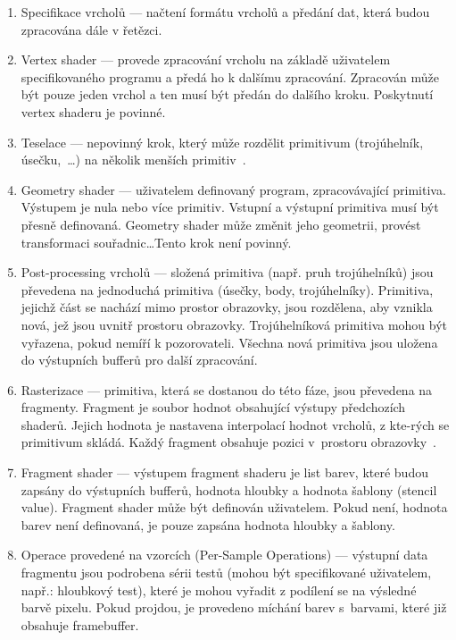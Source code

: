 \documentclass[thesis=M,czech]{FITthesis}[2019/12/23]
\begin{document}
\begin{enumerate}
\item Specifikace vrcholů --- načtení formátu vrcholů a předání dat, která budou zpracována dále v řetězci. 

\item Vertex shader --- provede zpracování vrcholu na základě uživatelem specifikovaného programu a předá ho k dalšímu zpracování. Zpracován může být pouze jeden vrchol a ten musí být předán do dalšího kroku. Poskytnutí vertex shaderu je povinné.

\item Teselace --- nepovinný krok, který může rozdělit primitivum (trojúhelník, úsečku,~\dots) na několik menších primitiv~\cite{kronos_tess}.

\item Geometry shader --- uživatelem definovaný program, zpracovávající primitiva. Výstupem je nula nebo více primitiv. Vstupní a výstupní primitiva musí být přesně definovaná. Geometry shader může změnit jeho geometrii, provést transformaci souřadnic\dots Tento krok není povinný.

\item Post-processing vrcholů --- složená primitiva (např. pruh trojúhelníků) jsou převedena na jednoduchá primitiva (úsečky, body, trojúhelníky). Primitiva, jejichž část se nachází mimo prostor obrazovky, jsou rozdělena, aby vznikla nová, jež jsou uvnitř prostoru obrazovky. Trojúhelníková primitiva mohou být vyřazena, pokud nemíří k pozorovateli. Všechna nová primitiva jsou uložena do výstupních bufferů pro další zpracování.

\item Rasterizace --- primitiva, která se dostanou do této fáze, jsou převedena na fragmenty. Fragment je soubor hodnot obsahující výstupy předchozích shaderů. Jejich hodnota je nastavena interpolací hodnot vrcholů, z kte-rých se primitivum skládá. Každý fragment obsahuje pozici v~prostoru obrazovky~\cite{kronos_frag}.

\item Fragment shader --- výstupem fragment shaderu je list barev, které budou zapsány do výstupních bufferů, hodnota hloubky a hodnota šablony (stencil value). Fragment shader může být definován uživatelem. Pokud není, hodnota barev není definovaná, je pouze zapsána hodnota hloubky a šablony.

\item Operace provedené na vzorcích (Per-Sample Operations) --- výstupní data fragmentu jsou podrobena sérii testů (mohou být specifikované uživatelem, např.: hloubkový test), které je mohou vyřadit z podílení se na výsledné barvě pixelu. Pokud projdou, je provedeno míchání barev s~barvami, které již obsahuje framebuffer.
\end{enumerate}
\end{document}
